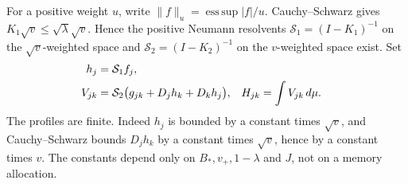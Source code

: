 For a positive weight $u$, write $\|f\|_u=\operatorname*{ess\,sup}|f|/u$. Cauchy--Schwarz gives $K_1\sqrt v\le\sqrt\lambda\sqrt v$. Hence the positive Neumann resolvents $\mathcal S_1=(I-K_1)^{-1}$ on the $\sqrt v$-weighted space and $\mathcal S_2=(I-K_2)^{-1}$ on the $v$-weighted space exist. Set
\begin{align}
 h_j&=\mathcal S_1 f_j,\label{eq:resolvent-profiles}\\
 V_{jk}&=\mathcal S_2\bigl(g_{jk}+D_jh_k+D_kh_j\bigr),
 &H_{jk}&=\int V_{jk}\,d\mu.\notag
\end{align}
The profiles are finite. Indeed $h_j$ is bounded by a constant times $\sqrt v$, and Cauchy--Schwarz bounds $D_jh_k$ by a constant times $\sqrt v$, hence by a constant times $v$. The constants depend only on $B_*,v_+,1-\lambda$ and $J$, not on a memory allocation.

